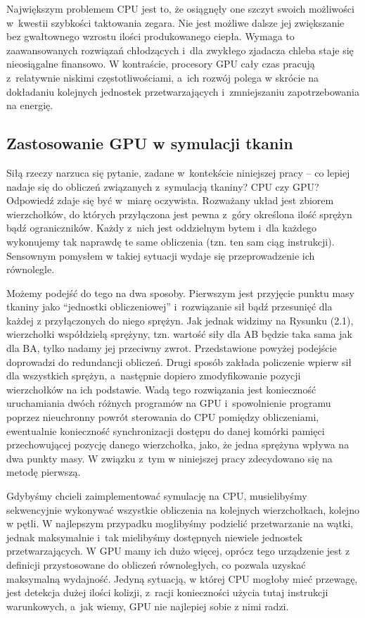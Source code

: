 		Największym problemem CPU jest to, że osiągnęły one szczyt swoich możliwości w~kwestii szybkości taktowania zegara. Nie jest możliwe dalsze jej zwiększanie bez gwałtownego wzrostu ilości produkowanego ciepła. Wymaga to zaawansowanych rozwiązań chłodzących i~dla zwykłego zjadacza chleba staje się nieosiągalne finansowo. W kontraście, procesory GPU cały czas pracują z~relatywnie niskimi częstotliwościami, a~ich rozwój polega w skrócie na dokładaniu kolejnych jednostek przetwarzających i~zmniejszaniu zapotrzebowania na energię.
		
		\subsection{Zastosowanie GPU w symulacji tkanin}
		\label{t:teoria:gpu:zalety}
		
		Siłą rzeczy narzuca się pytanie, zadane w~kontekście niniejszej pracy -- co lepiej nadaje się do obliczeń związanych z~symulacją tkaniny? CPU czy GPU? Odpowiedź zdaje się być w~miarę oczywista. Rozważany układ jest zbiorem wierzchołków, do których przyłączona jest pewna z~góry określona ilość sprężyn bądź ograniczników. Każdy z~nich jest oddzielnym bytem i~dla każdego wykonujemy tak naprawdę te same obliczenia (tzn. ten sam ciąg instrukcji). Sensownym pomysłem w takiej sytuacji wydaje się przeprowadzenie ich równolegle. 
		
		Możemy podejść do tego na dwa sposoby. Pierwszym jest przyjęcie punktu masy tkaniny jako ``jednostki obliczeniowej'' i~rozwiązanie sił bądź przesunięć dla każdej z przyłączonych do niego sprężyn. Jak jednak widzimy na Rysunku (2.1), wierzchołki współdzielą sprężyny, tzn. wartość siły dla AB będzie taka sama jak dla BA, tylko nadamy jej przeciwny zwrot. Przedstawione powyżej podejście doprowadzi do redundancji obliczeń. Drugi sposób zakłada policzenie wpierw sił dla wszystkich sprężyn, a~następnie dopiero zmodyfikowanie pozycji wierzchołków na ich podstawie. Wadą tego rozwiązania jest konieczność uruchamiania dwóch różnych programów na GPU i~spowolnienie programu poprzez nieuchronny powrót sterowania do CPU pomiędzy obliczeniami, ewentualnie konieczność synchronizacji dostępu do danej komórki pamięci przechowującej pozycję danego wierzchołka, jako, że jedna sprężyna wpływa na dwa punkty masy. W związku z~tym w niniejszej pracy zdecydowano się na metodę pierwszą.
		
		Gdybyśmy chcieli zaimplementować symulację na CPU, musielibyśmy sekwencyjnie wykonywać wszystkie obliczenia na kolejnych wierzchołkach, kolejno w pętli. W najlepszym przypadku moglibyśmy podzielić przetwarzanie na wątki, jednak maksymalnie i~tak mielibyśmy dostępnych niewiele jednostek przetwarzających. W GPU mamy ich dużo więcej, oprócz tego urządzenie jest z definicji przystosowane do obliczeń równoległych, co pozwala uzyskać maksymalną wydajność. Jedyną sytuacją, w której CPU mogłoby mieć przewagę, jest detekcja dużej ilości kolizji, z~racji konieczności użycia tutaj instrukcji warunkowych, a~jak wiemy, GPU nie najlepiej sobie z nimi radzi.
		

